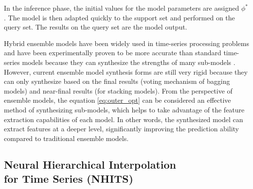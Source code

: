 \documentclass[aps,prb,groupedaddress,twocolumn,showpacs,dvipdfmx,superscriptaddress,pdftex]{revtex4-2}
\begin{document}
\vspace{2mm}


In the inference phase, the initial values for the model parameters are assigned $\phi^*$. The model is then adapted quickly to the support set and performed on the query set. The results on the query set are the model output.

\vspace{2mm}


Hybrid ensemble models have been widely used in time-series processing problems and have been experimentally proven to be more accurate than standard time-series models because they can synthesize the strengths of many sub-models \cite{ayitey2023forex}. However, current ensemble model synthesis forms are still very rigid because they can only synthesize based on the final results (voting mechanism of bagging models) and near-final results (for stacking models). From the perspective of ensemble models, the equation \ref{eq:outer_opt} can be considered an effective method of synthesizing sub-models, which helps to take advantage of the feature extraction capabilities of each model. In other words, the synthesized model can extract features at a deeper level, significantly improving the prediction ability compared to traditional ensemble models.

\subsection{Neural Hierarchical Interpolation\\for Time Series (NHITS)}
\end{document}
